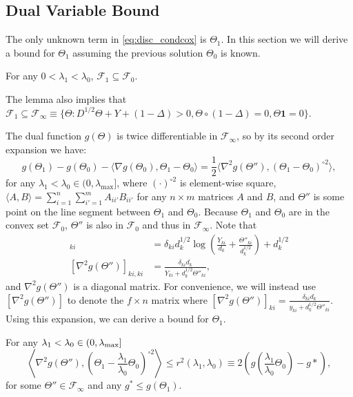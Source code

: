 \subsection{Dual Variable Bound}

The only unknown term in \eqref{eq:disc_condcox} is $\Theta_{1}$. In this section we will derive a bound for $\Theta_{1}$ assuming the previous solution $\Theta_{0}$ is known.

\begin{lemma}
    \label{lem:1}
    For any $0<\lambda_1<\lambda_0$, $\mathcal{F}_{1}\subseteq\mathcal{F}_{0}$.
\end{lemma}

The lemma also implies that $\mathcal{F}_{1}\subseteq\mathcal{F}_{\infty}\equiv\{\Theta: D^{1/2}\Theta+Y+(1-\Delta)> 0,\Theta\circ(1-\Delta)=0, \Theta\mathbf{1}=0\}$.

The dual function $g(\Theta)$ is twice differentiable in $\mathcal{F}_{\infty}$, so by its second order expansion we have:
\begin{equation}
        \label{eq:expand}
        g(\Theta_{1})-g(\Theta_{0})-\langle\nabla g(\Theta_{0}),\Theta_{1}-\Theta_{0}\rangle=\frac{1}{2}\langle\nabla^2 g(\Theta''),(\Theta_{1}-\Theta_{0})^{\circ 2}\rangle,%
\end{equation}
for any $\lambda_1<\lambda_{0}\in (0,\lambda_\textrm{max}]$, where $(\cdot)^{\circ2}$ is element-wise square, $\langle A,B\rangle=\sum_{i=1}^n\sum_{i'=1}^mA_{ii'}B_{ii'}$ for any $n\times m$ matrices $A$ and $B$, and $\Theta''$ is some point on the line segment between $\Theta_{1}$ and $\Theta_{0}$. Because $\Theta_{1}$ and $\Theta_{0}$ are in the convex set $\mathcal{F}_{0}$, $\Theta''$ is also in $\mathcal{F}_{0}$ and thus in $\mathcal{F}_{\infty}$. Note that
\begin{align*}
  [\nabla g(\Theta'')]_{ki} &= \delta_{ki}d_k^{1/2}\log\left(\frac{Y_{ki}}{d_k}+\frac{\Theta''_{ki}}{d_k^{1/2}}\right)+d_k^{1/2} \\
  [\nabla^2 g(\Theta'')]_{ki,ki} &= \frac{\delta_{ki}d_k}{Y_{ki}+d_k^{1/2}\Theta''_{ki}},
\end{align*}
and $\nabla^2 g(\Theta'')$ is a diagonal matrix. For convenience, we will instead use $[\nabla^2 g(\Theta'')]$ to denote the $f\times n$ matrix where $[\nabla^2 g(\Theta'')]_{ki}=\frac{\delta_{ki}d_k}{y_{ki}+d_k^{1/2}\Theta''_{ki}}$. Using this expansion, we can derive a bound for $\Theta_{1}$.
\begin{theorem}
    \label{thm:1}
    For any $\lambda_1<\lambda_{0}\in (0,\lambda_\textnormal{max}]$ 
    \begin{equation}
        \left\langle\nabla^2 g(\Theta''),\left(\Theta_{1}-\frac{\lambda_1}{\lambda_0}\Theta_{0}\right)^{\circ 2}\right\rangle\leq r^2(\lambda_1,\lambda_0)\equiv 2\left(g\left(\frac{\lambda_1}{\lambda_0}\Theta_{0}\right)-g*\right),
    \end{equation}
    for some $\Theta''\in\mathcal{F}_{\infty}$ and any $g^*\leq g(\Theta_{1})$.
\end{theorem}

